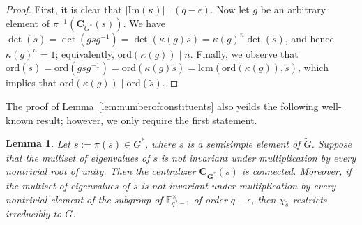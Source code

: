 \documentclass[12pt]{amsart}
\newtheorem{lemma}[theorem]{Lemma}
\theoremstyle{definition}
\numberwithin{equation}{section}
\newcommand{\ord}{{\mathrm {ord}}}
\renewcommand{\Im}{{\mathrm {Im}}}
\newcommand{\lcm}{{\mathrm {lcm}}}
\newcommand{\FF}{{\mathbb F}}
\newcommand{\bC}{{\mathbf{C}}}
\newcommand{\bG}{{\mathbf{G}}}
\newcommand{\bZ}{{\mathbf{Z}}}
\begin{document}
\begin{proof}
First, %
it %
is clear that $|\Im(\kappa)|\mid (q-\epsilon)$. Now %
let
$g$ be an arbitrary element of $\pi^{-1}(\bC_{G^*}(s))$. We have
$\det(\widetilde{s})=\det(g\widetilde{s}g^{-1})=\det(\kappa(g)\widetilde{s})=\kappa(g)^n\det(\widetilde{s})$,
and hence $\kappa(g)^n=1$; equivalently, $\ord(\kappa(g))\mid n$.
Finally, we observe that
$\ord(\widetilde{s})=\ord(g\widetilde{s}g^{-1})=\ord(\kappa(g)\widetilde{s})=\lcm(\ord(\kappa(g)),\widetilde{s})$,
which implies that $\ord(\kappa(g))\mid \ord(\widetilde{s})$.
\end{proof}

The proof of Lemma~\ref{lem:numberofconstituents} also yeilds the
following well-known result; however, we only require the %
first
statement.

\begin{lemma}\label{lem:2}
Let %
$s := \pi(\widetilde{s}) \in G^*$, where $\widetilde{s}$ is a
semisimple element of $\widetilde{G}$. Suppose that the multiset of
eigenvalues of $\widetilde{s}$ is not invariant under multiplication
by every nontrivial root of unity. Then the centralizer
$\bC_{\bG^*}(s)$ is connected. Moreover, if the multiset of
eigenvalues of $\widetilde{s}$ is not invariant under multiplication
by every nontrivial element of the subgroup of $\FF_{q^2-1}^\times$
of order $q-\epsilon$, then $\chi_{\widetilde{s}}$ restricts
irreducibly to $G$.
\end{lemma}
\end{document}
